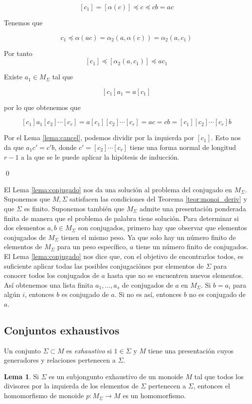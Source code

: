 \documentclass[12pt]{article}
\theoremstyle{definition}
\newtheorem{lema}{Lema}[section]
\begin{document}
$$[c_1]=[\alpha(c)]\preceq c \preceq cb = ac$$

Tenemos que

$$c_1\preceq\alpha(ac)=\alpha_2(a,\alpha(c))=\alpha_2(a,c_1)$$

Por tanto
$$[c_1]\preceq [\alpha_2(a,c_1)]\preceq ac_1$$

Existe $a_1\in M_\Sigma$ tal que

$$[c_1]a_1=a[c_1]$$

por lo que obtenemos que 

$$[c_1]a_1[c_2]\cdots[c_r]=a[c_1][c_2]\cdots[c_r]=ac=cb=[c_1][c_2]\cdots[c_r]b$$

Por el Lema \ref{lema:cancel}, podemos dividir por la izquierda por $[c_1]$. Esto nos da que $a_1c'=c'b$, donde $c'=[c_2]\cdots[c_r]$ tiene una forma normal de longitud $r-1$ a la que se le puede aplicar la hipótesis de inducción.

\qed

El Lema \ref{lema:conjugado} nos da una solución al problema del conjugado en $M_\Sigma$. Suponemos que $M,\Sigma$ satisfacen las condiciones del Teorema \ref{teor:monoi_deriv} y que $\Sigma$ es finito. Suponemos también que $M_\Sigma$ admite una presentación ponderada finita de manera que el problema de palabra tiene solución. Para determinar si dos elementos $a,b\in M_\Sigma$ son conjugados, primero hay que observar que elementos conjugados de $M_\Sigma$ tienen el mismo peso. Ya que solo hay un número finito de elementos de $M_\Sigma$ para un peso específico, $a$ tiene un número finito de conjugados. El Lema \ref{lema:conjugado} nos dice que, con el objetivo de encontrarlos todos, es suficiente aplicar todas las posibles conjugaciónes por elementos de $\Sigma$ para conocer todos los conjugados de $a$ hasta que no se encuentren nuevos elementos. Así obtenemos una lista finita $a_1,\ldots,a_s$ de conjugados de $a$ en $M_\Sigma$. Si $b=a_i$ para algún $i$, entonces $b$ es conjugado de $a$. Si no es así, entonces $b$ no es conjugado de $a$.

\subsection{Conjuntos exhaustivos}

Un conjunto $\Sigma\subset M$ es \textit{exhaustivo} si $1\in\Sigma$ y $M$ tiene una presentación cuyos generadores y relaciones pertenecen a $\Sigma$.

\begin{lema}
Si $\Sigma$ es un subjongunto exhaustivo de un monoide $M$ tal que todos los divisores por la izquierda de los elementos de $\Sigma$ pertenecen a $\Sigma$, entonces el homomorfismo de monoide $p:M_\Sigma\rightarrow M$ es un homomorfismo.
\label{lema:iso_mono}
\end{lema}
\end{document}
